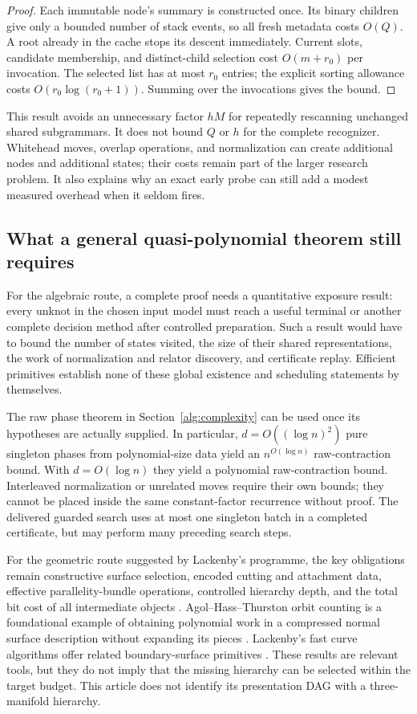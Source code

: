 \begin{proof}
Each immutable node's summary is constructed once. Its binary children
give only a bounded number of stack events, so all fresh metadata costs
$O(Q)$. A root already in the cache stops its descent immediately.
Current slots, candidate membership, and distinct-child selection cost
$O(m+r_0)$ per invocation. The selected list has at most $r_0$ entries;
the explicit sorting allowance costs $O(r_0\log(r_0+1))$.
Summing over the invocations gives the bound.
\end{proof}

This result avoids an unnecessary factor $hM$ for repeatedly rescanning
unchanged shared subgrammars. It does not bound $Q$ or $h$ for the complete
recognizer. Whitehead moves, overlap operations, and normalization can
create additional nodes and additional states; their costs remain part of
the larger research problem. It also explains why an exact early probe can
still add a modest measured overhead when it seldom fires.

\subsection{What a general quasi-polynomial theorem still requires}

For the algebraic route, a complete proof needs a quantitative exposure
result: every unknot in the chosen input model must reach a useful terminal
or another complete decision method after controlled preparation. Such a
result would have to bound the number of states visited, the size of their
shared representations, the work of normalization and relator discovery,
and certificate replay. Efficient primitives establish none of these
global existence and scheduling statements by themselves.

The raw phase theorem in Section~\ref{alg:complexity} can be used once its
hypotheses are actually supplied. In particular, $d=O((\log n)^2)$ pure
singleton phases from polynomial-size data yield an
$n^{O(\log n)}$ raw-contraction bound. With $d=O(\log n)$ they yield a
polynomial raw-contraction bound. Interleaved normalization or unrelated
moves require their own bounds; they cannot be placed inside the same
constant-factor recurrence without proof. The delivered guarded search
uses at most one singleton batch in a completed certificate, but may
perform many preceding search steps.

For the geometric route suggested by Lackenby's programme, the key
obligations remain constructive surface selection, encoded cutting and
attachment data, effective parallelity-bundle operations, controlled
hierarchy depth, and the total bit cost of all intermediate objects
\cite{Lackenby2026Hierarchy}. Agol--Hass--Thurston orbit counting is a
foundational example of obtaining polynomial work in a compressed normal
surface description without expanding its pieces \cite{AgolHassThurston2006}.
Lackenby's fast curve algorithms offer related boundary-surface primitives
\cite{Lackenby2026Curves}. These results are relevant tools, but they do
not imply that the missing hierarchy can be selected within the target
budget. This article does not identify its presentation DAG with a
three-manifold hierarchy.

